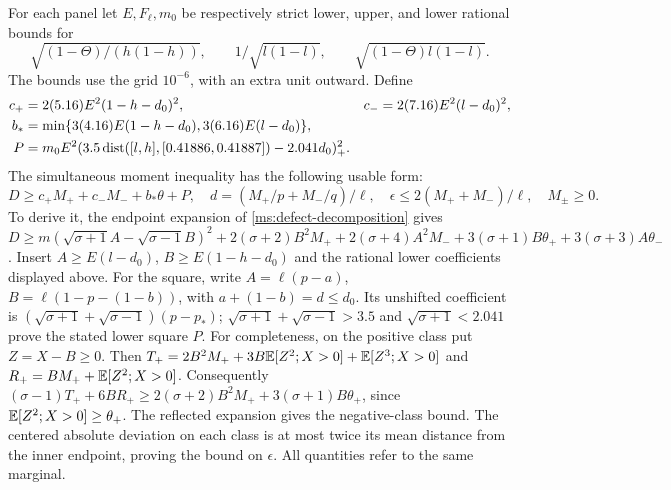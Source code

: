 For each panel let $E,F_\ell,m_0$ be respectively strict lower, upper,
and lower rational bounds for
\[
 \sqrt{(1-\Theta)/(h(1-h))},\qquad
 1/\sqrt{l(1-l)},\qquad \sqrt{(1-\Theta)l(1-l)}.
\]
The bounds use the grid $10^{-6}$, with an extra unit outward. Define
\begin{align*}
 c_+&=2(5.16)E^2(1-h-d_0)^2,&
 c_-&=2(7.16)E^2(l-d_0)^2,\\
 b_*&=\min\{3(4.16)E(1-h-d_0),3(6.16)E(l-d_0)\},\\
 P&=m_0E^2(3.5\operatorname{dist}([l,h],[0.41886,0.41887])-2.041d_0)_+^2.
\end{align*}
The simultaneous moment inequality has the following usable form:
\begin{equation}\label{ms:fourier:cut49:conf:moment}
 D\ge c_+M_++c_-M_-+b_*\theta+P,\quad
 d=(M_+/p+M_-/q)/\ell,\quad
 \epsilon\le2(M_++M_-)/\ell,\quad M_\pm\ge0.
\end{equation}
To derive it, the endpoint expansion of \eqref{ms:defect-decomposition} gives
$D\ge m(\sqrt{\sigma+1}A-\sqrt{\sigma-1}B)^2
+2(\sigma+2)B^2M_++2(\sigma+4)A^2M_-
+3(\sigma+1)B\theta_++3(\sigma+3)A\theta_-$.
Insert $A\ge E(l-d_0)$, $B\ge E(1-h-d_0)$ and the rational lower
coefficients displayed above. For the square, write
$A=\ell(p-a)$, $B=\ell(1-p-(1-b))$, with
$a+(1-b)=d\le d_0$. Its unshifted coefficient is
$(\sqrt{\sigma+1}+\sqrt{\sigma-1})(p-p_*)$;
$\sqrt{\sigma+1}+\sqrt{\sigma-1}>3.5$ and
$\sqrt{\sigma+1}<2.041$ prove the stated lower square $P$.
For completeness, on the positive class put $Z=X-B\ge0$.
Then $T_+=2B^2M_++3B\mathbb E[Z^2;X>0]+\mathbb E[Z^3;X>0]$ and
$R_+=BM_++\mathbb E[Z^2;X>0]$. Consequently
$(\sigma-1)T_++6BR_+\ge2(\sigma+2)B^2M_+
+3(\sigma+1)B\theta_+$, since $\mathbb E[Z^2;X>0]\ge\theta_+$.
The reflected expansion gives the negative-class bound.
The centered absolute deviation on each class is at most twice its
mean distance from the inner endpoint, proving the bound on $\epsilon$.
All quantities refer to the same marginal.


